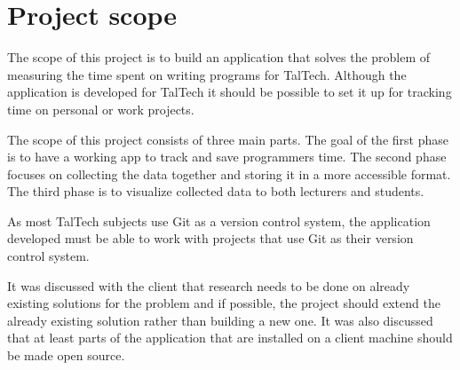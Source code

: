 \section{Project scope}\label{sec:project-scope}
The scope of this project is to build an application that solves the problem of measuring the time spent on writing programs for TalTech.
Although the application is developed for TalTech it should be possible to set it up for tracking time on personal or work projects.

The scope of this project consists of three main parts.
The goal of the first phase is to have a working app to track and save programmers time.
The second phase focuses on collecting the data together and storing it in a more accessible format.
The third phase is to visualize collected data to both lecturers and students.

As most TalTech subjects use Git as a version control system, the application developed must be able to work with
projects that use Git as their version control system.

It was discussed with the client that research needs to be done on already existing solutions for the problem and if possible,
the project should extend the already existing solution rather than building a new one.
It was also discussed that at least parts of the application that are installed on a client machine should be made open source.
